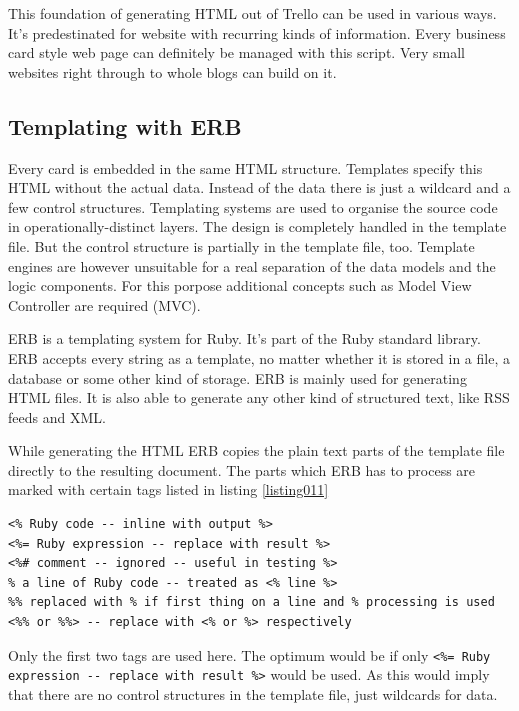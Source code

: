 This foundation of generating HTML out of Trello can be used in various ways. It's predestinated for website with recurring kinds of information. Every business card style web page can definitely be managed with this script. Very small websites right through to whole blogs can build on it.

\subsection{Templating with ERB}
Every card is embedded in the same HTML structure. Templates specify this HTML without the actual data. Instead of the data there is just a wildcard and a few control structures. Templating systems are used to organise the source code in operationally-distinct layers. The design is completely handled in the template file. But the control structure is partially in the template file, too. Template engines are however unsuitable for a real separation of the data models and the logic components. For this porpose additional concepts such as Model View Controller are required (MVC).

ERB is a templating system for Ruby. It's part of the Ruby standard library. ERB accepts every string as a template, no matter whether it is stored in a file, a database or some other kind of storage. ERB is mainly used for generating HTML files. It is also able to generate any other kind of structured text, like RSS feeds and XML. \cite{erb:introduction} \cite{erb:docu}

While generating the HTML ERB copies the plain text parts of the template file directly to the resulting document.  The parts which ERB has to process are marked with certain tags listed in listing \ref{listing011}
\begin{lstlisting}[aboveskip=1\baselineskip, style=bash, caption=Recognised tags in ERB., label=listing011]
<% Ruby code -- inline with output %>
<%= Ruby expression -- replace with result %>
<%# comment -- ignored -- useful in testing %>
% a line of Ruby code -- treated as <% line %> 
%% replaced with % if first thing on a line and % processing is used
<%% or %%> -- replace with <% or %> respectively
\end{lstlisting}
Only the first two tags are used here. The optimum would be if only \lstinline{<%= Ruby expression -- replace with result %>} would be used. As this would imply that there are no control structures in the template file, just wildcards for data.

